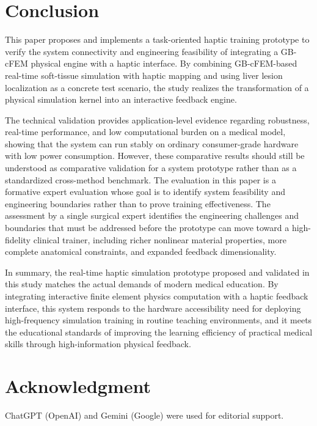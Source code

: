 \documentclass{ieeeaccess}
\begin{document}
\section{Conclusion}
This paper proposes and implements a task-oriented haptic training prototype to verify the system connectivity and engineering feasibility of integrating a GB-cFEM physical engine with a haptic interface. By combining GB-cFEM-based real-time soft-tissue simulation with haptic mapping and using liver lesion localization as a concrete test scenario, the study realizes the transformation of a physical simulation kernel into an interactive feedback engine.

The technical validation provides application-level evidence regarding robustness, real-time performance, and low computational burden on a medical model, showing that the system can run stably on ordinary consumer-grade hardware with low power consumption. However, these comparative results should still be understood as comparative validation for a system prototype rather than as a standardized cross-method benchmark. The evaluation in this paper is a formative expert evaluation whose goal is to identify system feasibility and engineering boundaries rather than to prove training effectiveness. The assessment by a single surgical expert identifies the engineering challenges and boundaries that must be addressed before the prototype can move toward a high-fidelity clinical trainer, including richer nonlinear material properties, more complete anatomical constraints, and expanded feedback dimensionality.

In summary, the real-time haptic simulation prototype proposed and validated in this study matches the actual demands of modern medical education. By integrating interactive finite element physics computation with a haptic feedback interface, this system responds to the hardware accessibility need for deploying high-frequency simulation training in routine teaching environments, and it meets the educational standards of improving the learning efficiency of practical medical skills through high-information physical feedback.

\section*{Acknowledgment}
ChatGPT (OpenAI) and Gemini (Google) were used for editorial support.



\end{document}
